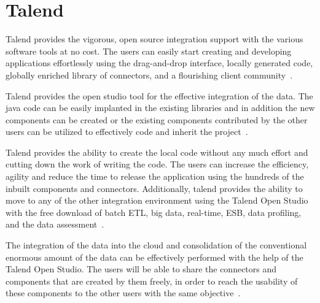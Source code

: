 \section{Talend}
Talend provides the vigorous, open source integration support with the various
software tools at no cost. The users can easily start creating and developing
applications effortlessly using the drag-and-drop interface, locally generated
code, globally enriched library of connectors, and a flourishing client
community~\cite{hid-sp18-412-talend_products}.

Talend provides the open studio tool for the effective integration of the data.
 The java code can be easily implanted in the existing libraries and in
addition the new components can be created or the existing components
contributed by the other users can be utilized to effectively code and
inherit the project~\cite{hid-sp18-412-talend_open_studio}.

Talend provides the ability to create the local code without any much effort
and cutting down the work of writing the code.
The users can increase the efficiency, agility and
reduce the time to release the application using the hundreds of the
inbuilt components and connectors. Additionally, talend provides the
ability to move to any of the other integration environment using the
Talend Open Studio with the free download of batch ETL, big data, real-time,
ESB, data profiling, and
the data assessment~\cite{hid-sp18-412-talend_products}.

The integration of the data into the cloud and consolidation of the
conventional enormous amount of the data can be effectively performed
with the help of the Talend Open Studio. The users will be able to share
the connectors and components that are created by them freely,
in order to reach the usability of these components to the
other users with the same objective~\cite{hid-sp18-412-talend_products}.



